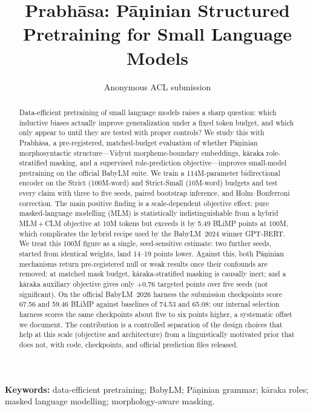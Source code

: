 \documentclass[11pt]{article}
\title{Prabh\=asa: P\=a\d{n}inian Structured Pretraining for Small Language Models}
\author{Anonymous ACL submission}
\begin{document}
\maketitle

\begin{abstract}
Data-efficient pretraining of small language models raises a sharp question: which inductive biases actually improve generalization under a fixed token budget, and which only appear to until they are tested with proper controls? We study this with Prabh\=asa, a pre-registered, matched-budget evaluation of whether P\=a\d{n}inian morphosyntactic structure---Vidyut morpheme-boundary embeddings, k\=araka role-stratified masking, and a supervised role-prediction objective---improves small-model pretraining on the official BabyLM suite. We train a 114M-parameter bidirectional encoder on the Strict (100M-word) and Strict-Small (10M-word) budgets and test every claim with three to five seeds, paired bootstrap inference, and Holm--Bonferroni correction. The main positive finding is a scale-dependent objective effect: pure masked-language modelling (MLM) is statistically indistinguishable from a hybrid MLM\,+\,CLM objective at 10M tokens but exceeds it by 5.49 BLiMP points at 100M, which complicates the hybrid recipe used by the BabyLM~2024 winner GPT-BERT. We treat this 100M figure as a single, seed-sensitive estimate: two further seeds, started from identical weights, land 14--19 points lower. Against this, both P\=a\d{n}inian mechanisms return pre-registered null or weak results once their confounds are removed: at matched mask budget, k\=araka-stratified masking is causally inert; and a k\=araka auxiliary objective gives only $+0.76$ targeted points over five seeds (not significant). On the official BabyLM~2026 harness the submission checkpoints score 67.56 and 59.46 BLiMP against baselines of 74.53 and 65.08; our internal selection harness scores the same checkpoints about five to six points higher, a systematic offset we document. The contribution is a controlled separation of the design choices that help at this scale (objective and architecture) from a linguistically motivated prior that does not, with code, checkpoints, and official prediction files released.
\end{abstract}

\noindent\textbf{Keywords:} data-efficient pretraining; BabyLM; P\=a\d{n}inian grammar; k\=araka roles; masked language modelling; morphology-aware masking.
\end{document}
